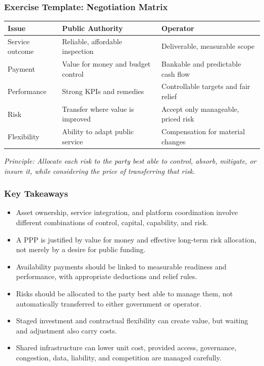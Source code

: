 \documentclass{beamer}
\begin{document}
\begin{frame}[t]
\frametitle{Exercise Template: Negotiation Matrix}
\begin{center}
\begin{tabular}{p{}|p{}|p{}}
\textbf{Issue} & \textbf{Public Authority} & \textbf{Operator}\\
\hline
Service outcome & Reliable, affordable inspection & Deliverable, measurable scope\\
Payment & Value for money and budget control & Bankable and predictable cash flow\\
Performance & Strong KPIs and remedies & Controllable targets and fair relief\\
Risk & Transfer where value is improved & Accept only manageable, priced risk\\
Flexibility & Ability to adapt public service & Compensation for material changes\\
\end{tabular}
\end{center}
\vspace{0.3cm}
\textit{Principle: Allocate each risk to the party best able to control, absorb, mitigate, or insure it, while considering the price of transferring that risk.}
\end{frame}

\begin{frame}[t]
\frametitle{Key Takeaways}
\begin{itemize}
\item Asset ownership, service integration, and platform coordination involve different combinations of control, capital, capability, and risk.
\item A PPP is justified by value for money and effective long-term risk allocation, not merely by a desire for public funding.
\item Availability payments should be linked to measurable readiness and performance, with appropriate deductions and relief rules.
\item Risks should be allocated to the party best able to manage them, not automatically transferred to either government or operator.
\item Staged investment and contractual flexibility can create value, but waiting and adjustment also carry costs.
\item Shared infrastructure can lower unit cost, provided access, governance, congestion, data, liability, and competition are managed carefully.
\end{itemize}
\end{frame}
\end{document}
